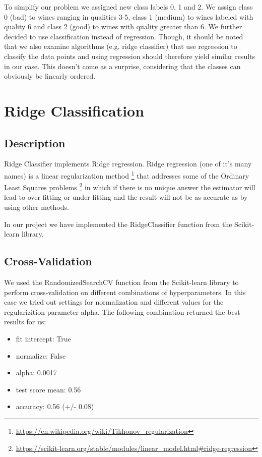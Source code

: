 \documentclass[twocolumn]{scrartcl}
\begin{document}
To simplify our problem we assigned new class labels 0, 1 and 2. We assign class 0 (bad) to wines ranging in qualities 3-5,
class 1 (medium) to wines labeled with quality 6 and class 2 (good) to wines with quality greater than 6.
We further decided to use classification instead of regression.
Though, it should be noted that we also examine algorithms (e.g. ridge classifier) that use regression to classify the data points
and using regression should therefore yield similar results in our case.
This doesn't come as a surprise, considering that the classes can obviously be linearly ordered.

\section{Ridge Classification}
\subsection{Description}
Ridge Classifier implements Ridge regression.
Ridge regression (one of it's many names) is a linear regularization method
\footnote{\url{https://en.wikipedia.org/wiki/Tikhonov_regularization}}
that addresses some of the Ordinary Least Squares problems
\footnote{\url{https://scikit-learn.org/stable/modules/linear_model.html\#ridge-regression}}
in which if there is no unique answer the estimator will lead to over fitting or under fitting and the result will not be as accurate as by using other methods.

In our project we have implemented the RidgeClassifier function from the Scikit-learn library.
\subsection{Cross-Validation}
We used the RandomizedSearchCV function from the Scikit-learn library to perform cross-validation on different combinations of hyperparameters. In this case we tried out settings for normalization and different values for the regularizition parameter alpha. The following combination returned the best results for us:

\begin{itemize}
    \item{fit intercept: True}
    \item{normalize: False}
    \item{alpha: 0.0017}
    \item{test score mean: 0.56}
    \item{accuracy: 0.56 (+/- 0.08)}
\end{itemize}
\end{document}
